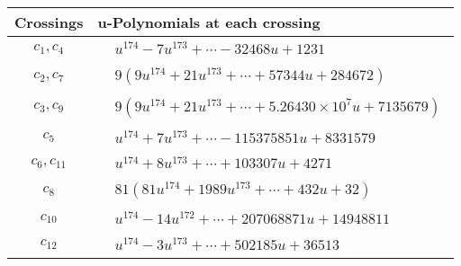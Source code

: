 \documentclass[1p]{elsarticle_modified}
\theoremstyle{definition}
\begin{document}
\begin{tabular}{m{50pt}|m{274pt}}
Crossings & \hspace{64pt}u-Polynomials at each crossing \\
\hline $$\begin{aligned}c_{1},c_{4}\end{aligned}$$&$\begin{aligned}
&u^{174}-7 u^{173}+\cdots-32468 u+1231
\end{aligned}$\\
\hline $$\begin{aligned}c_{2},c_{7}\end{aligned}$$&$\begin{aligned}
&9(9 u^{174}+21 u^{173}+\cdots+57344 u+284672)
\end{aligned}$\\
\hline $$\begin{aligned}c_{3},c_{9}\end{aligned}$$&$\begin{aligned}
&9(9 u^{174}+21 u^{173}+\cdots+5.26430\times10^{7} u+7135679)
\end{aligned}$\\
\hline $$\begin{aligned}c_{5}\end{aligned}$$&$\begin{aligned}
&u^{174}+7 u^{173}+\cdots-115375851 u+8331579
\end{aligned}$\\
\hline $$\begin{aligned}c_{6},c_{11}\end{aligned}$$&$\begin{aligned}
&u^{174}+8 u^{173}+\cdots+103307 u+4271
\end{aligned}$\\
\hline $$\begin{aligned}c_{8}\end{aligned}$$&$\begin{aligned}
&81(81 u^{174}+1989 u^{173}+\cdots+432 u+32)
\end{aligned}$\\
\hline $$\begin{aligned}c_{10}\end{aligned}$$&$\begin{aligned}
&u^{174}-14 u^{172}+\cdots+207068871 u+14948811
\end{aligned}$\\
\hline $$\begin{aligned}c_{12}\end{aligned}$$&$\begin{aligned}
&u^{174}-3 u^{173}+\cdots+502185 u+36513
\end{aligned}$\\
\hline
\end{tabular}\\~\\
\end{document}
